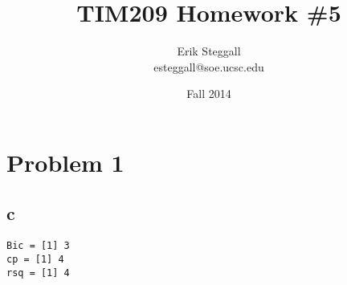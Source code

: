 \documentclass{article}
\title{TIM209 Homework \#5}
\author{Erik Steggall \\ esteggall@soe.ucsc.edu}
\date{Fall 2014}
\begin{document}
 \maketitle \pagestyle{empty}
\section*{Problem 1}
\subsection*{c}
\begin{verbatim}
Bic = [1] 3
cp = [1] 4
rsq = [1] 4
\end{verbatim}



\end{document}
